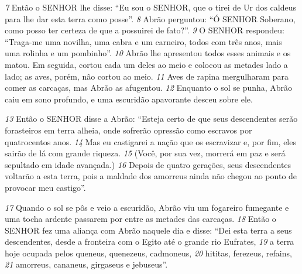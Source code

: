 \bigskip
\textit{\tiny 7}
Então o SENHOR lhe disse: “Eu sou o SENHOR, que o tirei de Ur dos caldeus para
lhe dar esta terra como posse”.
\textit{\tiny 8}
Abrão perguntou: “Ó SENHOR Soberano, como posso ter certeza de que a
possuirei de fato?”.
\textit{\tiny 9}
O SENHOR respondeu: “Traga-me uma novilha, uma cabra e um carneiro, todos
com três anos, mais uma rolinha e um pombinho”. 
\textit{\tiny 10}
Abrão lhe apresentou todos
esses animais e os matou. Em seguida, cortou cada um deles ao meio e colocou as
metades lado a lado; as aves, porém, não cortou ao meio. 
\textit{\tiny 11}
Aves de rapina
mergulharam para comer as carcaças, mas Abrão as afugentou.
\textit{\tiny 12}
Enquanto  o sol se punha, Abrão caiu em sono profundo, e uma escuridão
apavorante desceu sobre ele. 

\bigskip
\textit{\tiny 13}
Então o SENHOR disse a Abrão: “Esteja certo de que
seus descendentes serão forasteiros em terra alheia, onde sofrerão opressão
como escravos por quatrocentos anos. 
\textit{\tiny 14}
Mas eu castigarei a nação que os
escravizar e, por fim, eles sairão de lá com grande riqueza. 
\textit{\tiny 15}
(Você, por sua vez,
morrerá em paz e será sepultado em idade avançada.) 
\textit{\tiny 16}
Depois de quatro
gerações, seus descendentes voltarão a esta terra, pois a maldade dos amorreus
ainda não chegou ao ponto de provocar meu castigo”.

\bigskip
\textit{\tiny 17}
Quando o sol se pôs e veio a escuridão, Abrão viu um fogareiro fumegante e
uma tocha ardente passarem por entre as metades das carcaças. 
\textit{\tiny 18}
Então o SENHOR
fez uma aliança com Abrão naquele dia e disse: “Dei esta terra a seus
descendentes, desde a fronteira com o Egito até o grande rio Eufrates, 
\textit{\tiny 19}
a terra
hoje ocupada pelos queneus, quenezeus, cadmoneus, 
\textit{\tiny 20}
hititas, ferezeus, refains,
\textit{\tiny 21}
amorreus, cananeus, girgaseus e jebuseus”.

